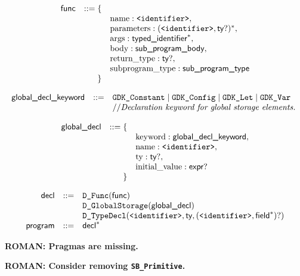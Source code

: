 \documentclass{book}
\begin{document}
\[
\begin{array}{rrl}
\textsf{func} &::= \{& \\
 & & \text{name} : \texttt{<identifier>}, \\
 & & \text{parameters} : (\texttt{<identifier>}, \textsf{ty}?)^*,\\
 & & \text{args} : \textsf{typed\_identifier}^*,\\
 & & \text{body} : \textsf{sub\_program\_body},\\
 & & \text{return\_type} : \textsf{ty}?,\\
 & & \text{subprogram\_type} : \textsf{sub\_program\_type}\\
 & \} &
\end{array}
\]

\[
\begin{array}{rcl}
\textsf{global\_decl\_keyword} &::=& \texttt{GDK\_Constant} \;|\; \texttt{GDK\_Config} \;|\; \texttt{GDK\_Let} \;|\; \texttt{GDK\_Var}\\
  & & // \textit{Declaration keyword for global storage elements.}\ \\
\end{array}
\]

\[
\begin{array}{rrl}
\textsf{global\_decl} &::= \{& \\
 & & \text{keyword} : \textsf{global\_decl\_keyword}, \\
 & & \text{name} : \texttt{<identifier>},\\
 & & \text{ty} : \textsf{ty}?,\\
 & & \text{initial\_value} : \textsf{expr}?\\
 & \} &
\end{array}
\]

\[
\begin{array}{rcl}
\textsf{decl} &::=& \texttt{D\_Func}(\textsf{func})\\
  & & \texttt{D\_GlobalStorage}(\textsf{global\_decl})\\
  & & \texttt{D\_TypeDecl}(\texttt{<identifier>}, \textsf{ty}, (\texttt{<identifier>}, \textsf{field}^*)?)\\
\textsf{program} &::=& \textsf{decl}^*\\
\end{array}
\]

\textbf{ROMAN: Pragmas are missing.}

\textbf{ROMAN: Consider removing \texttt{SB\_Primitive}.}
\end{document}
